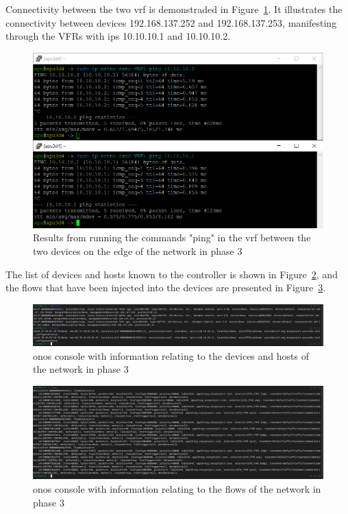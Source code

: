 Connectivity between the two \gls{vrf} is demonstraded in Figure~\ref{fig:exp1_phase4_pings}. It illustrates the connectivity between devices 192.168.137.252 and 192.168.137.253, manifesting through the VFRs with \glspl{ip} 10.10.10.1 and 10.10.10.2.

\begin{figure}
	\centering
	\includegraphics[width=\textwidth]{Chapters/Figures/tests/ovs_phase_4/pings.PNG}
	\caption{Results from running the commands "ping" in the \gls{vrf} between the two devices on the edge of the network in phase 3}
	\label{fig:exp1_phase4_pings}
\end{figure}

The list of devices and hosts known to the controller is shown in Figure~\ref{fig:exp1_phase4_onos}, and the flows that have been injected into the devices are presented in Figure~\ref{fig:exp1_phase4_onos_flows}.

\begin{figure}
	\centering
	\includegraphics[width=\textwidth]{Chapters/Figures/tests/ovs_phase_4/onos_topology.PNG}
	\caption{\gls{onos} console with information relating to the devices and hosts of the network in phase 3}
	\label{fig:exp1_phase4_onos}
\end{figure}

\begin{figure}
	\centering
	\includegraphics[width=\textwidth]{Chapters/Figures/tests/ovs_phase_4/onos_flows.PNG}
	\caption{\gls{onos} console with information relating to the flows of the network in phase 3}
	\label{fig:exp1_phase4_onos_flows}
\end{figure}

